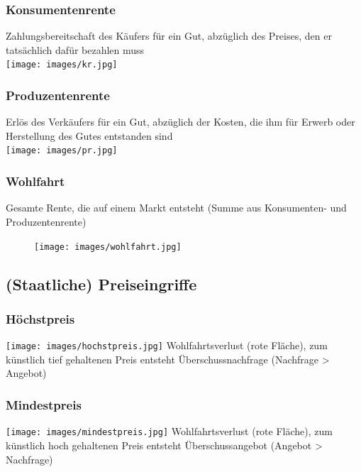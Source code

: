 \begin{multicols}{2}
	\subsubsection{Konsumentenrente}
	Zahlungsbereitschaft des Käufers für ein Gut,
	abzüglich des Preises, den er tatsächlich dafür bezahlen muss\\
	\texttt{[image: images/kr.jpg]}
	\subsubsection{Produzentenrente}
	Erlös des Verkäufers für ein Gut, abzüglich der
	Kosten, die ihm für Erwerb oder Herstellung des Gutes entstanden sind\\
	\texttt{[image: images/pr.jpg]}
\end{multicols}

\subsubsection{Wohlfahrt}
Gesamte Rente, die auf einem Markt entsteht (Summe
aus Konsumenten- und Produzentenrente)\\
\begin{figure}[h]
	\centering
	\texttt{[image: images/wohlfahrt.jpg]}
\end{figure}
\centering
{}
\flushleft
\clearpage
\pagebreak

\subsection{(Staatliche) Preiseingriffe}
\begin{multicols}{2}
	\subsubsection{Höchstpreis}
	\texttt{[image: images/hochstpreis.jpg]}
	Wohlfahrtsverlust (rote Fläche), zum künstlich tief gehaltenen Preis entsteht Überschussnachfrage (Nachfrage > Angebot)
	\columnbreak
	\subsubsection{Mindestpreis}
	\texttt{[image: images/mindestpreis.jpg]}
	Wohlfahrtsverlust (rote Fläche), zum künstlich hoch gehaltenen Preis entsteht Überschussangebot (Angebot > Nachfrage)
\end{multicols}

